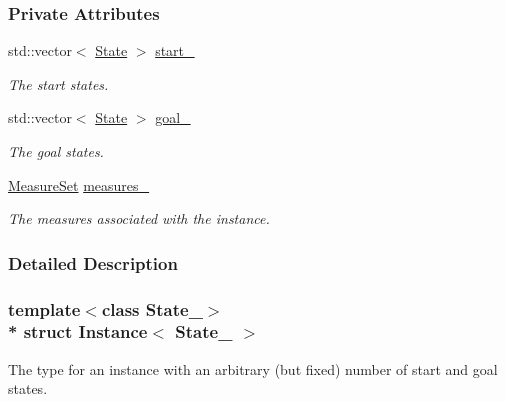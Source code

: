 \subsubsection*{Private Attributes}
\begin{DoxyCompactItemize}
\item 
std\+::vector$<$ \hyperlink{structInstance_a464461e0e371f5f3af9e228751ed265e}{State} $>$ \hyperlink{structInstance_a431d2dbdffa735ed62233f8219edb934}{start\+\_\+}\hypertarget{structInstance_a431d2dbdffa735ed62233f8219edb934}{}\label{structInstance_a431d2dbdffa735ed62233f8219edb934}

\begin{DoxyCompactList}\small\item\em The start states. \end{DoxyCompactList}\item 
std\+::vector$<$ \hyperlink{structInstance_a464461e0e371f5f3af9e228751ed265e}{State} $>$ \hyperlink{structInstance_ae72e7d88b593444dceefde99e6c651ca}{goal\+\_\+}\hypertarget{structInstance_ae72e7d88b593444dceefde99e6c651ca}{}\label{structInstance_ae72e7d88b593444dceefde99e6c651ca}

\begin{DoxyCompactList}\small\item\em The goal states. \end{DoxyCompactList}\item 
\hyperlink{structMeasureSet}{Measure\+Set} \hyperlink{structInstance_a3c103201aab755bb13f8af276bd1f727}{measures\+\_\+}\hypertarget{structInstance_a3c103201aab755bb13f8af276bd1f727}{}\label{structInstance_a3c103201aab755bb13f8af276bd1f727}

\begin{DoxyCompactList}\small\item\em The measures associated with the instance. \end{DoxyCompactList}\end{DoxyCompactItemize}


\subsubsection{Detailed Description}
\subsubsection*{template$<$class State\+\_\+$>$\\*
struct Instance$<$ State\+\_\+ $>$}

The type for an instance with an arbitrary (but fixed) number of start and goal states. 


